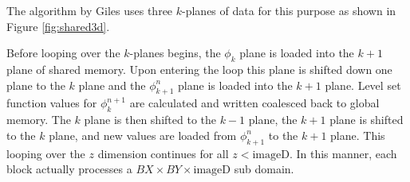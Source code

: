 The algorithm by Giles \cite{mgiles} uses three $k$-planes of data for this purpose as shown in Figure \ref{fig:shared3d}.



Before looping over the $k$-planes begins, the $\phi_k$ plane is loaded into the $k+1$ plane of shared memory. Upon entering the loop this plane is shifted down one plane to the $k$ plane and the $\phi_{k+1}^n$ plane is loaded into the $k+1$ plane. Level set function values for $\phi_{k}^{n+1}$ are calculated and written coalesced back to global memory. The $k$ plane is then shifted to the $k-1$ plane, the $k+1$ plane is shifted to the $k$ plane, and new values are loaded from $\phi_{k+1}^n$ to the $k+1$ plane. This looping over the $z$ dimension continues for all $z<\textrm{imageD}$. In this manner, each block actually processes a $BX \times BY \times \textrm{imageD}$ sub domain.

